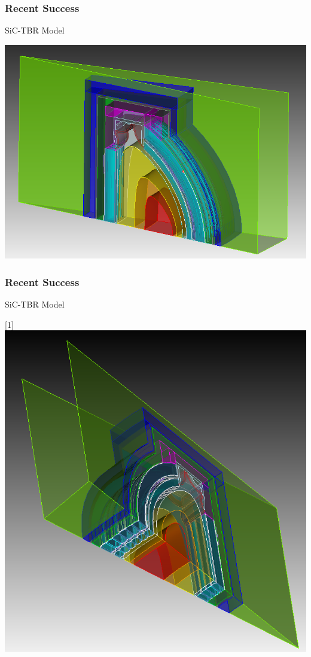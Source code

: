 \documentclass[14pt]{beamer}
\begin{document}
\begin{frame}
\frametitle{Recent Success}

SiC-TBR Model
\begin{center}
\includegraphics[scale=0.35]{sic.png}
\end{center}

\end{frame}


\begin{frame}
\frametitle{Recent Success}

SiC-TBR Model
\begin{center}
\scalebox{-1}[1]{\includegraphics[scale=0.3]{sic-bottom.png}}
\end{center}

\end{frame}
\end{document}
